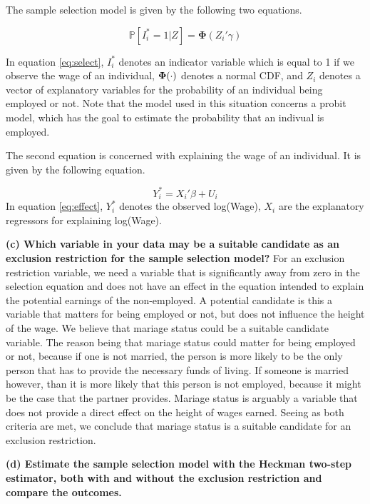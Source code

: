 \documentclass[
]{article}
\begin{document}
The sample selection model is given by the following two equations.

\begin{equation}
\mathbb{P}[I_i^*=1|Z]=\mathbf{\Phi} (Z_i'\gamma)
\label{eq:select}
\end{equation}

In equation \ref{eq:select}, \(I_i^*\) denotes an indicator variable
which is equal to 1 if we observe the wage of an individual,
\(\bf{\Phi}(\cdot)\) denotes a normal CDF, and \(Z_i\) denotes a vector
of explanatory variables for the probability of an individual being
employed or not. Note that the model used in this situation concerns a
probit model, which has the goal to estimate the probability that an
indivual is employed.

The second equation is concerned with explaining the wage of an
individual. It is given by the following equation.

\begin{equation}
Y_i^* = X_i'\beta + U_i
\label{eq:effect}
\end{equation} In equation \ref{eq:effect}, \(Y_i^*\) denotes the
observed log(Wage), \(X_i\) are the explanatory regressors for
explaining log(Wage).

\textbf{(c) Which variable in your data may be a suitable candidate as
an exclusion restriction for the sample selection model?} For an
exclusion restriction variable, we need a variable that is significantly
away from zero in the selection equation and does not have an effect in
the equation intended to explain the potential earnings of the
non-employed. A potential candidate is this a variable that matters for
being employed or not, but does not influence the height of the wage. We
believe that mariage status could be a suitable candidate variable. The
reason being that mariage status could matter for being employed or not,
because if one is not married, the person is more likely to be the only
person that has to provide the necessary funds of living. If someone is
married however, than it is more likely that this person is not
employed, because it might be the case that the partner provides.
Mariage status is arguably a variable that does not provide a direct
effect on the height of wages earned. Seeing as both criteria are met,
we conclude that mariage status is a suitable candidate for an exclusion
restriction.

\textbf{(d) Estimate the sample selection model with the Heckman
two-step estimator, both with and without the exclusion restriction and
compare the outcomes.}
\end{document}
